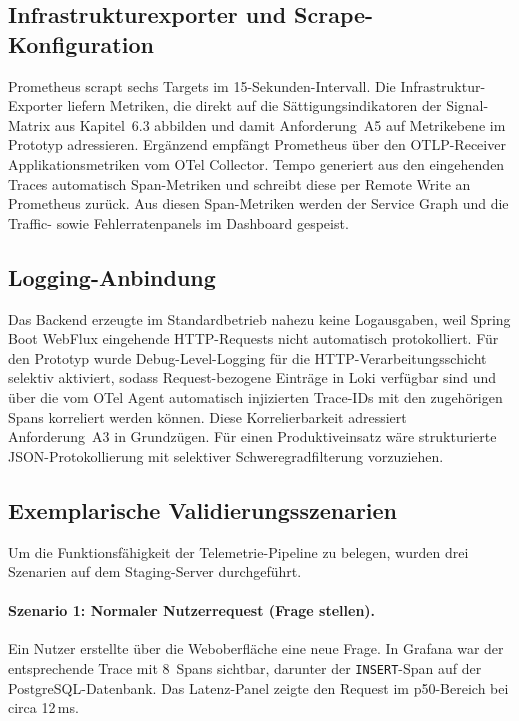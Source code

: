 \subsection{Infrastrukturexporter und Scrape-Konfiguration}

Prometheus scrapt sechs Targets im 15-Sekunden-Intervall. Die Infrastruktur-Exporter liefern Metriken, die direkt auf die Sättigungsindikatoren der Signal-Matrix aus Kapitel~6.3 abbilden und damit Anforderung~A5 auf Metrikebene im Prototyp adressieren. Ergänzend empfängt Prometheus über den OTLP-Receiver Applikationsmetriken vom OTel Collector. Tempo generiert aus den eingehenden Traces automatisch Span-Metriken und schreibt diese per Remote Write an Prometheus zurück. Aus diesen Span-Metriken werden der Service Graph und die Traffic- sowie Fehlerratenpanels im Dashboard gespeist.


\subsection{Logging-Anbindung}

Das Backend erzeugte im Standardbetrieb nahezu keine Logausgaben, weil Spring Boot WebFlux eingehende HTTP-Requests nicht automatisch protokolliert. Für den Prototyp wurde Debug-Level-Logging für die HTTP-Verarbeitungsschicht selektiv aktiviert, sodass Request-bezogene Einträge in Loki verfügbar sind und über die vom OTel Agent automatisch injizierten Trace-IDs mit den zugehörigen Spans korreliert werden können. Diese Korrelierbarkeit adressiert Anforderung~A3 in Grundzügen. Für einen Produktiveinsatz wäre strukturierte JSON-Protokollierung mit selektiver Schweregradfilterung vorzuziehen.


\subsection{Exemplarische Validierungsszenarien}
\label{sec:validierung}

Um die Funktionsfähigkeit der Telemetrie-Pipeline zu belegen, wurden drei Szenarien auf dem Staging-Server durchgeführt.

\paragraph{Szenario 1: Normaler Nutzerrequest (Frage stellen).}
Ein Nutzer erstellte über die Weboberfläche eine neue Frage. In Grafana war der entsprechende Trace mit 8~Spans sichtbar, darunter der \texttt{INSERT}-Span auf der PostgreSQL-Datenbank. Das Latenz-Panel zeigte den Request im p50-Bereich bei circa 12\,ms.


